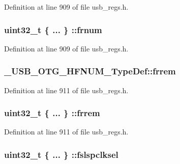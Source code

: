 Definition at line 909 of file usb\-\_\-regs.\-h.

\hypertarget{group___u_s_b___o_t_g___d_r_i_v_e_r_gae34392b8f72a90dbc7cd72e8c5c1ae64}{
\subsubsection[{frnum}]{\setlength{\rightskip}{0pt plus 5cm}uint32\-\_\-t \{ ... \} \-::frnum}}\label{group___u_s_b___o_t_g___d_r_i_v_e_r_gae34392b8f72a90dbc7cd72e8c5c1ae64}


Definition at line 909 of file usb\-\_\-regs.\-h.

\hypertarget{group___u_s_b___o_t_g___d_r_i_v_e_r_ga0b1c8ac23ba14c94587b89a7a5afaa94}{
\subsubsection[{frrem}]{ \-\_\-\-U\-S\-B\-\_\-\-O\-T\-G\-\_\-\-H\-F\-N\-U\-M\-\_\-\-Type\-Def\-::frrem}}\label{group___u_s_b___o_t_g___d_r_i_v_e_r_ga0b1c8ac23ba14c94587b89a7a5afaa94}


Definition at line 911 of file usb\-\_\-regs.\-h.

\hypertarget{group___u_s_b___o_t_g___d_r_i_v_e_r_ga5b4698de49b411406147acc43bb02be0}{
\subsubsection[{frrem}]{\setlength{\rightskip}{0pt plus 5cm}uint32\-\_\-t \{ ... \} \-::frrem}}\label{group___u_s_b___o_t_g___d_r_i_v_e_r_ga5b4698de49b411406147acc43bb02be0}


Definition at line 911 of file usb\-\_\-regs.\-h.

\hypertarget{group___u_s_b___o_t_g___d_r_i_v_e_r_ga982eb07641b6e00f134966311da124be}{
\subsubsection[{fslspclksel}]{\setlength{\rightskip}{0pt plus 5cm}uint32\-\_\-t \{ ... \} \-::fslspclksel}}\label{group___u_s_b___o_t_g___d_r_i_v_e_r_ga982eb07641b6e00f134966311da124be}



